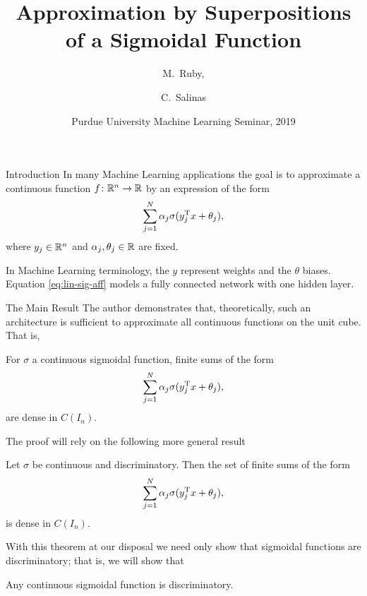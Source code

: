 \documentclass[11pt,letterpaper]{beamer}
\title[Approximation by a Sigmoidal Function] 
{Approximation by Superpositions of a Sigmoidal Function}
\author[M.\ Ruby, C.\ Salinas] 
{M.\ Ruby,%
  \and C.\ Salinas%
}
\institute[Purdue University] %
{
  Department of Mathematics\\
  Purdue University
 }
\date[Spring 2019] %
{Purdue University Machine Learning Seminar, 2019}
\begin{document}
\frame{\titlepage}

\begin{frame}{Introduction}
  In many Machine Learning applications the goal is to approximate a continuous
  function $f\colon\mathbb{R}^n\to\mathbb{R}$ by an expression of the form
  \begin{equation}
    \label{eq:lin-sig-aff}
    \sum_{j=1}^N \alpha_j\sigma( y_j^{\mathrm{T}} x+\theta_j),
  \end{equation}
  where $ y_j\in\mathbb{R}^n$ and $\alpha_j,\theta_j\in\mathbb{R}$ are fixed.

  In Machine Learning terminology, the $ y$ represent weights and the $\theta$
  biases. Equation \eqref{eq:lin-sig-aff} models a fully connected network with
  one hidden layer.
\end{frame}

\begin{frame}{The Main Result}
  The author demonstrates that, theoretically, such an architecture is
  sufficient to approximate all continuous functions on the unit cube. That is,
  \begin{theorem}[Theorem 2 in C89]
    For $\sigma$ a continuous sigmoidal function, finite sums of the form
    \[
      \sum_{j=1}^N \alpha_j\sigma( y_j^{\mathrm{T}} x+\theta_j),
    \]
    are dense in $C(I_n)$.
  \end{theorem}
\end{frame}

\begin{frame}
  The proof will rely on the following more general result
  \begin{theorem}[Theorem 1 in C89]
    Let $\sigma$ be continuous and discriminatory. Then the set of finite sums
    of the form
    \[
      \sum_{j=1}^N \alpha_j\sigma( y_j^{\mathrm{T}} x+\theta_j),
    \]
    is dense in $C(I_n)$.
  \end{theorem}
  With this theorem at our disposal we need only show that sigmoidal functions
  are discriminatory; that is, we will show that
    \begin{lemma}[Lemma 1 in C89]
      Any continuous sigmoidal function is discriminatory.
  \end{lemma}
\end{frame}
\end{document}
